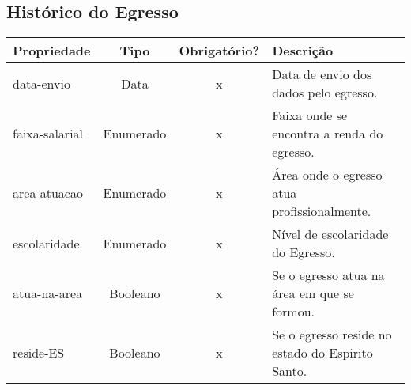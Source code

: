 \subsection{Histórico do Egresso} \label{Histórico-do-Egresso}
\begin{table}[h!]
	\footnotesize
	\begin{tabular}{|p{2.6cm}|c|c|p{7.8cm}|}   \hline \rowcolor[rgb]{0.8,0.8,0.8}
	
		
 		\textbf{Propriedade} & \textbf{Tipo} & \textbf{Obrigatório?} & \centerline{\textbf{Descrição}} \\\hline  	
	
 		data-envio & Data & x & Data de envio dos dados pelo egresso. \\\hline
		                      
		faixa-salarial & Enumerado & x & Faixa onde se encontra a renda do egresso. \\\hline
		
		area-atuacao & Enumerado & x & Área onde o egresso atua profissionalmente. \\\hline
		
		escolaridade & Enumerado & x & Nível de escolaridade do Egresso. \\\hline
		
		atua-na-area & Booleano & x & Se o egresso atua na área em que se formou. \\\hline		
		
		reside-ES & Booleano & x & Se o egresso reside no estado do Espirito Santo. \\\hline	
			
	
	\end{tabular}	
\end{table}


